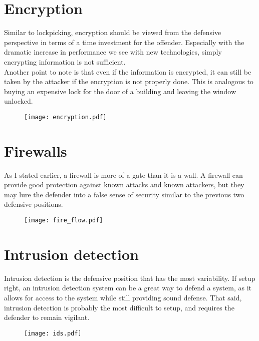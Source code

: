 \documentclass{article}
\begin{document}
\section{Encryption}
Similar to lockpicking, encryption should be viewed from the defensive perspective in terms of a time investment for the offender. Especially with the dramatic increase in performance we see with new technologies, simply encrypting information is not sufficient.\\
Another point to note is that even if the information is encrypted, it can still be taken by the attacker if the encryption is not properly done. This is analogous to buying an expensive lock for the door of a building and leaving the window unlocked.\\
\begin{figure}[ht]
\centering
\texttt{[image: encryption.pdf]}
\end{figure}
\pagebreak

\section{Firewalls}
As I stated earlier, a firewall is more of a gate than it is a wall. A firewall can provide good protection against known attacks and known attackers, but they may lure the defender into a false sense of security similar to the previous two defensive positions. \\
\begin{figure}[ht]
\centering
\texttt{[image: fire\_flow.pdf]}
\end{figure}
\pagebreak

\section{Intrusion detection}
Intrusion detection is the defensive position that has the most variability. If setup right, an intrusion detection system can be a great way to defend a system, as it allows for access to the system while still providing sound defense. That said, intrusion detection is probably the most difficult to setup, and requires the defender to remain vigilant.\\
\begin{figure}[ht]
\centering
\texttt{[image: ids.pdf]}
\end{figure}
\pagebreak
\end{document}
